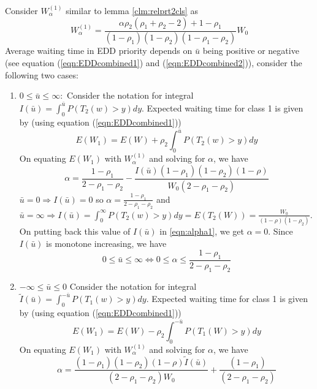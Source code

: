 \documentclass[a4paper,12pt]{article}
\newenvironment{mylemma}[1]{{ \textbf{\textit{Proof of Lemma #1:}}}}{}
\begin{document}
\begin{appendices}
\begin{mylemma}{\ref{clm:EDDcomplete}}
Consider $W_{\alpha}^{(1)}$ similar to lemma \ref{clm:relprt2cls} as 
\begin{equation}
W_{\alpha}^{(1)} = \dfrac{\alpha \rho_2 (\rho_1 + \rho_2 	- 2) + 1-\rho_1 }{(1 - \rho_1)(1 - \rho_2)(1 - \rho_1 - \rho_2)}W_0
\end{equation}
Average waiting time in EDD priority depends on $\bar{u}$ being positive or negative (see equation (\ref{eqn:EDDcombined1}) and (\ref{eqn:EDDcombined2})), consider the following two cases:
\begin{enumerate}
\item $0 \leq \bar{u} \leq \infty:$ Consider the notation for integral $I(\bar{u}) = \int_0^{\bar{u}}P(T_2(w)> y)dy$. Expected waiting time for class 1 is given by (using equation (\ref{eqn:EDDcombined1}))
\begin{equation}\nonumber
E(W_1) = E(W) + \rho_2 \int_0^{\bar{u}}P(T_2(w)> y)dy
\end{equation}
On equating $E(W_1)$ with $W_{\alpha}^{(1)}$ and solving for $\alpha$, we have
\begin{equation}\label{eqn:alpha1}
\alpha = \dfrac{1-\rho_1}{2-\rho_1 -\rho_2} - \dfrac{I(\bar{u})(1-\rho_1)(1-\rho_2)(1-\rho)}{W_0(2-\rho_1 - \rho_2)}
\end{equation}
$\bar{u} = 0 \Rightarrow  I(\bar{u}) = 0$ so $\alpha = \frac{1-\rho_1}{2-\rho_1-\rho_2}$ and $\bar{u} = \infty \Rightarrow I(\bar{u}) = \int_0^{\infty}P(T_2(w)> y)dy = E(T_2(W)) = \frac{W_0}{(1-\rho)(1-\rho_2)}$. On putting back this value of $I(\bar{u})$ in \ref{eqn:alpha1}, we get $\alpha = 0$. Since $I(\bar{u})$ is monotone increasing, we have 
\begin{equation}
0 \leq \bar{u} \leq \infty \Leftrightarrow 0 \leq \alpha \leq \frac{1-\rho_1}{2-\rho_1 -\rho_2}
\end{equation}
\item $-\infty \leq \bar{u} \leq 0$ Consider the notation for integral $\tilde{I}(\bar{u}) = \int_0^{-\bar{u}}P(T_1(w)> y)dy$. Expected waiting time for class 1 is given by (using equation (\ref{eqn:EDDcombined1}))
\begin{equation}\nonumber
E(W_1) = E(W) - \rho_2 \int_0^{-\bar{u}}P(T_1(W)> y)dy
\end{equation}
On equating $E(W_1)$ with $W_{\alpha}^{(1)}$ and solving for $\alpha$, we have
\begin{equation}\label{eqn:alpha2}
\alpha = \dfrac{(1-\rho_1)(1-\rho_2)(1-\rho)\tilde{I}(\bar{u})}{(2-\rho_1 -\rho_2)W_0} + \dfrac{(1-\rho_1)}{(2-\rho_1 - \rho_2)}

\end{equation}
\end{enumerate}
\end{mylemma}
\end{appendices}
\end{document}
